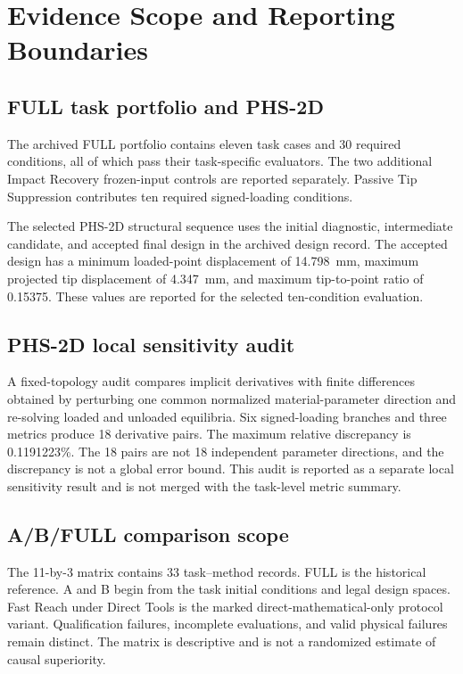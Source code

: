 \section{Evidence Scope and Reporting Boundaries}
\label{app:evidence-provenance}

\subsection{FULL task portfolio and PHS-2D}

The archived FULL portfolio contains eleven task cases and 30 required conditions, all of which pass their task-specific evaluators. The two additional Impact Recovery frozen-input controls are reported separately. Passive Tip Suppression contributes ten required signed-loading conditions.

The selected PHS-2D structural sequence uses the initial diagnostic, intermediate candidate, and accepted final design in the archived design record. The accepted design has a minimum loaded-point displacement of 14.798~mm, maximum projected tip displacement of 4.347~mm, and maximum tip-to-point ratio of 0.15375. These values are reported for the selected ten-condition evaluation.

\subsection{PHS-2D local sensitivity audit}

A fixed-topology audit compares implicit derivatives with finite differences obtained by perturbing one common normalized material-parameter direction and re-solving loaded and unloaded equilibria. Six signed-loading branches and three metrics produce 18 derivative pairs. The maximum relative discrepancy is 0.1191223\%. The 18 pairs are not 18 independent parameter directions, and the discrepancy is not a global error bound. This audit is reported as a separate local sensitivity result and is not merged with the task-level metric summary.

\subsection{A/B/FULL comparison scope}

The 11-by-3 matrix contains 33 task--method records. FULL is the historical reference. A and B begin from the task initial conditions and legal design spaces. Fast Reach under Direct Tools is the marked direct-mathematical-only protocol variant. Qualification failures, incomplete evaluations, and valid physical failures remain distinct. The matrix is descriptive and is not a randomized estimate of causal superiority.

